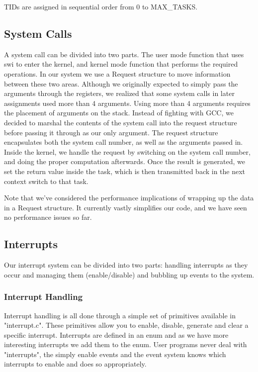 \documentclass{article}
\begin{document}
TIDs are assigned in sequential order from 0 to MAX\_TASKS.

\subsection{System Calls}

A system call can be divided into two parts. The user mode function that uses swi to enter the kernel, and kernel mode function that performs the required operations. In our system we use a Request structure to move information between these two areas. Although we originally expected to simply pass the arguments through the registers, we realized that some system calls in later assignments used more than 4 arguments. Using more than 4 arguments requires the placement of arguments on the stack. Instead of fighting with GCC, we decided to marshal the contents of the system call into the request structure before passing it through as our only argument. The request structure encapsulates both the system call number, as well as the arguments passed in. Inside the kernel, we handle the request by switching on the system call number, and doing the proper computation afterwards. Once the result is generated, we set the return value inside the task, which is then transmitted back in the next context switch to that task.

Note that we've considered the performance implications of wrapping up the data in a Request structure. It currently vastly simplifies our code, and we have seen no performance issues so far.

\subsection{Interrupts}

Our interrupt system can be divided into two parts: handling interrupts as they occur and managing them (enable/disable) and bubbling up events to the system.

\subsubsection{Interrupt Handling}

Interrupt handling is all done through a simple set of primitives available in "interrupt.c". These primitives allow you to enable, disable, generate and clear a specific interrupt. Interrupts are defined in an enum and as we have more interesting interrupts we add them to the enum. User programs never deal with "interrupts", the simply enable events and the event system knows which interrupts to enable and does so appropriately.
\end{document}
